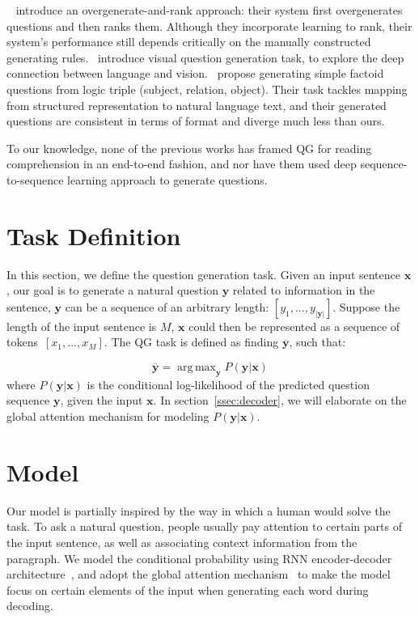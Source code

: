 \documentclass[11pt,a4paper]{article}
\DeclareMathOperator*{\argmax}{arg\,max} %
\begin{document}
~ introduce an overgenerate-and-rank approach: their system first overgenerates questions and then ranks them. Although they incorporate learning to rank, their system's performance still depends critically on the manually constructed generating rules.~ introduce visual question generation task, to explore the deep connection between language and vision.~ propose generating simple factoid questions from logic triple (subject, relation, object). 
Their task tackles mapping from structured representation to natural language text, and their generated questions are consistent in terms of format and diverge much less than ours. 

To our knowledge, none of the previous works has framed QG for reading comprehension in an end-to-end fashion, and nor have them used deep sequence-to-sequence learning approach to generate questions.


\section{Task Definition}
\label{sec:task}

In this section, we define the question generation task. Given an input sentence $\mathbf{x}$, our goal is to generate a natural question $\mathbf{y}$ related to information in the sentence, $\mathbf{y}$ can be a sequence of an arbitrary length: $[ y_1, ..., y_{|\mathbf{y}|}]$. Suppose the length of the input sentence is $M$, $\mathbf{x}$ could then be represented as a sequence of tokens~$[ x_1, ..., x_M]$. The QG task is defined as finding $\mathbf{\overline{y}}$, such that:

\begin{equation}
\label{equ:task}
\mathbf{\overline{y}} = \argmax_{\mathbf{y}} P \left( \mathbf{y} \vert \mathbf{x} \right)
\end{equation}
where $P \left(\mathbf{y} \vert \mathbf{x} \right)$ is the conditional log-likelihood of the predicted question sequence $\mathbf{y}$, given the input $\mathbf{x}$. In section~\ref{ssec:decoder}, we will elaborate on the global attention mechanism for modeling $P \left(\mathbf{y} \vert \mathbf{x} \right)$.

\section{Model}
\label{sec:model}

Our model is partially inspired by the way in which a human would solve the task. To ask a natural question, people usually pay attention to certain parts of the input sentence, as well as associating context information from the paragraph. We model the conditional probability using RNN encoder-decoder architecture~\cite{bahdanau2014neural, cho2014phrase}, and adopt the global attention mechanism~\cite{luong2015effective} to make the model focus on certain elements of the input when generating each word during decoding. 
\end{document}
